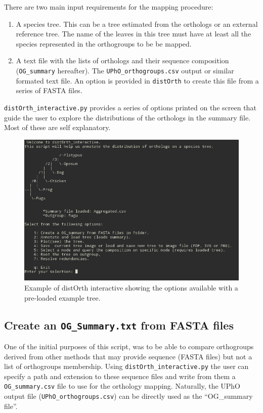 \documentclass[10pt]{article}
\begin{document}
There are two main input requirements for the mapping procedure:
\begin{enumerate}
  \item A species tree. This can be a tree estimated from the
orthologs or an external reference tree. The name of the leaves in
this tree must have at least all the species represented in the orthogroups to be be mapped.
  \item A text file with the lists of orthologs and their sequence composition (\texttt{OG\_summary} hereafter). The  \texttt{UPhO\_orthogroups.csv} output or similar formated text file. An option is provided in \texttt{distOrth}  to create this file from a series of FASTA files.
\end{enumerate} 

\texttt{distOrth\_interactive.py} provides a series of options printed on the screen that guide the user to explore the distributions of the orthologs in the summary file. Most of these are self explanatory.


\begin{figure}[t!]
\includegraphics[width=\textwidth]{distOrthmenu}
\caption{Example of distOrth interactive showing the options available with a pre-loaded example tree.}
\end{figure}

\subsection{Create an \texttt{OG\_Summary.txt} from FASTA files}
One of the initial purposes of this script, was to be
able to compare orthogroups derived from other methods that may
provide sequence (FASTA files) but not a list of orthogroups
membership. Using \texttt{distOrth\_interactive.py} the user can specify
a path and extension to these sequence files and write from them a
\texttt{OG\_summary.csv} file to use for the orthology
mapping. Naturally, the UPhO output file (\texttt{UPhO\_orthogroups.csv}) can be
directly used as the ``OG\_summary file''.
\end{document}
